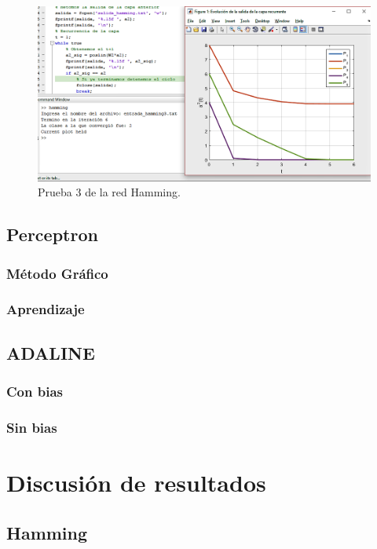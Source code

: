 \documentclass[12pt, titlepage]{article}
\begin{document}
            \begin{figure}[H]
                \begin{center}
                    \includegraphics[width=16cm]{img/hamming3.png}
                    \caption{Prueba 3 de la red Hamming.}
                    \label{fig:hamming3}
                \end{center}
            \end{figure}
        \subsection{Perceptron}
            \subsubsection{Método Gráfico}
            \subsubsection{Aprendizaje}
        \subsection{ADALINE}
            \subsubsection{Con bias}
            \subsubsection{Sin bias}
    \section{Discusión de resultados}
        \subsection{Hamming}
\end{document}
